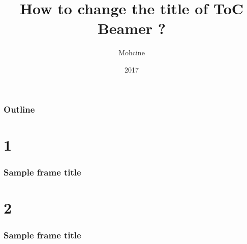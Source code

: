 \documentclass[leqno]{beamer}
\title{How to change the title of ToC Beamer ?}
\author{Mohcine}
\institute{Tex.stackexchange.com}
\date{2017}
\begin{document}
 \maketitle



\begin{frame}
\frametitle{Outline}
\tableofcontents
\end{frame}
\section[1]{1}
\begin{frame}
\frametitle{Sample frame title}
\end{frame}
 \section[2]{2}
\begin{frame}
\frametitle{Sample frame title}
\end{frame}
\end{document}
